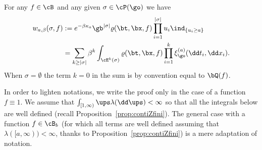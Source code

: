 \begin{lemma}
\label{lemma:claim}
For any $f\in \cB$ and any given $\sigma\in \cP(\go)$ we have
\begin{equation*}
\begin{split}
w_{a,\beta}(\sigma,f)& := e^{- \beta \kappa_a } \gb^{|\sigma|} \varrho(\bt,\bx,f) \prod_{i=1}^{|\sigma|} u_i\ind_{\{u_i\geq a\}} \\
& =\sum_{k\ge |\sigma|} \beta^k\int_{ \cE^k(\sigma)} \varrho(\bt,\bx,f) \prod_{i=1}^k \xi_{\go}^{(a)} (\dd t_i,\dd x_i).
\end{split}
\end{equation*}
When $\sigma=\emptyset$ the term $k=0$ in the sum is by convention equal to $\bQ(f)$.
\end{lemma}

In order to lighten notations, we write the proof only
in the case of a function $f\equiv 1$. We assume that
$\int_{[1,\infty)} \ups \lambda(\dd \ups) <\infty$ so that
all the integrals below are well defined (recall Proposition~\ref{prop:contiZfini}).
The general case with a function $f\in \cB_b$ (for which all terms are well defined assuming that $\lambda([a,\infty))<\infty$, thanks to Proposition~\ref{prop:contiZfini})
is a mere adaptation of notation.

